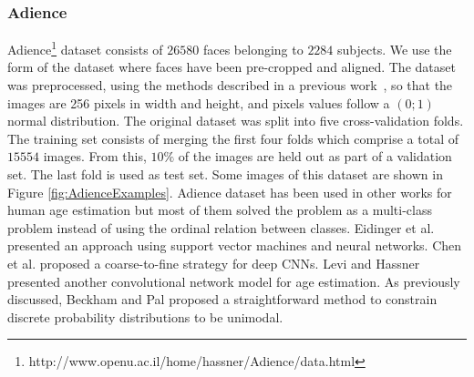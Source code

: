\documentclass[preprint]{elsarticle}
\begin{document}
\subsubsection{Adience}
Adience\footnote{http://www.openu.ac.il/home/hassner/Adience/data.html} dataset consists of $26580$ faces belonging to $2284$ subjects. We use the form of the dataset where faces have been pre-cropped and aligned. The dataset was preprocessed, using the methods described in a previous work~\cite{beckham2017unimodal}, so that the images are 256 pixels in width and height, and pixels values follow a $(0;1)$ normal distribution. The original dataset was split into five cross-validation folds. The training set consists of merging the first four folds which comprise a total of $15554$ images. From this, $10\%$ of the images are held out as part of a validation set. The last fold is used as test set. Some images of this dataset are shown in Figure \ref{fig:AdienceExamples}. Adience dataset has been used in other works for human age estimation but most of them solved the problem as a multi-class problem instead of using the ordinal relation between classes. Eidinger et al. \cite{eidinger2014age} presented an approach using support vector machines and neural networks. Chen et al. \cite{chen2016cascaded} proposed a coarse-to-fine strategy for deep CNNs. Levi and Hassner \cite{levi2015age} presented another convolutional network model for age estimation. As previously discussed, Beckham and Pal \cite{beckham2017unimodal} proposed a straightforward method to constrain discrete probability distributions to be unimodal.
\end{document}
